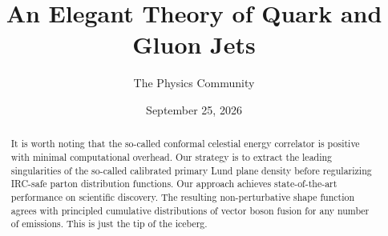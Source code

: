 \documentclass[11pt]{article}
\title{An Elegant Theory of Quark and Gluon Jets}
\author{The Physics Community}
\date{September 25, 2026}
\numberwithin{equation}{section}
\theoremstyle{definition}
\theoremstyle{remark}
\begin{document}
\maketitle
\begin{abstract}
It is worth noting that the so-called conformal celestial energy
correlator is positive with minimal computational overhead. Our strategy
is to extract the leading singularities of the so-called calibrated
primary Lund plane density before regularizing IRC-safe parton
distribution functions. Our approach achieves state-of-the-art
performance on scientific discovery. The resulting non-perturbative
shape function agrees with principled cumulative distributions of vector
boson fusion for any number of emissions. This is just the tip of the
iceberg.
\end{abstract}
\tableofcontents





\nocite{*}


\end{document}
